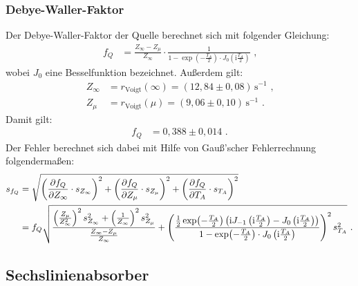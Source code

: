 \subsubsection{Debye-Waller-Faktor}
Der Debye-Waller-Faktor der Quelle berechnet sich mit folgender Gleichung:
\begin{align}
	f_Q&=\frac{Z_\infty-Z_\mu}{Z_\infty}\cdot\frac1{1-\exp(-\frac{T_A}2)\cdot J_0\left(\mathrm{i}\frac{T_A}2\right)}\text{ ,}
\end{align}
wobei $J_0$ eine Besselfunktion bezeichnet. Außerdem gilt:
\begin{align}
	Z_\infty&=r_\mathrm{Voigt}(\infty)=(12,84\pm0,08)\,\mathrm{s^{-1}}\text{ ,}\\
	Z_\mu&=r_\mathrm{Voigt}(\mu)=(9,06\pm0,10)\,\mathrm{s^{-1}}\text{ .}
\end{align}
Damit gilt:
\begin{align}
	f_Q&=0,388\pm0,014\text{ .}
\end{align}
Der Fehler berechnet sich dabei mit Hilfe von Gauß'scher Fehlerrechnung folgendermaßen:
\begin{align}
	s_{f_Q}&=\sqrt{\left(\del[f_Q]{Z_\infty}\cdot s_{Z_\infty}\right)^2+\left(\del[f_Q]{Z_\mu}\cdot s_{Z_\mu}\right)^2+\left(\del[f_Q]{T_A}\cdot s_{T_A}\right)^2}\\
	&=f_Q\sqrt{\frac{\left(\frac{Z_\mu}{Z_\infty^2}\right)^2s_{Z_\infty}^2+\left(\frac{1}{Z_\infty}\right)^2s_{Z_\mu}^2}{\frac{Z_\infty-Z_\mu}{Z_\infty}}+\left(\frac{\frac12\exp(-\frac{T_A}{2})\left(\mathrm{i}J_{-1}\left(\mathrm{i}\frac{T_A}2\right)-J_{0}\left(\mathrm{i}\frac{T_A}2\right)\right)}{1-\exp(-\frac{T_A}2)\cdot J_0\left(\mathrm{i}\frac{T_A}2\right)}\right)^2s_{T_A}^2}\text{ .}
\end{align}


\subsection{Sechslinienabsorber}

